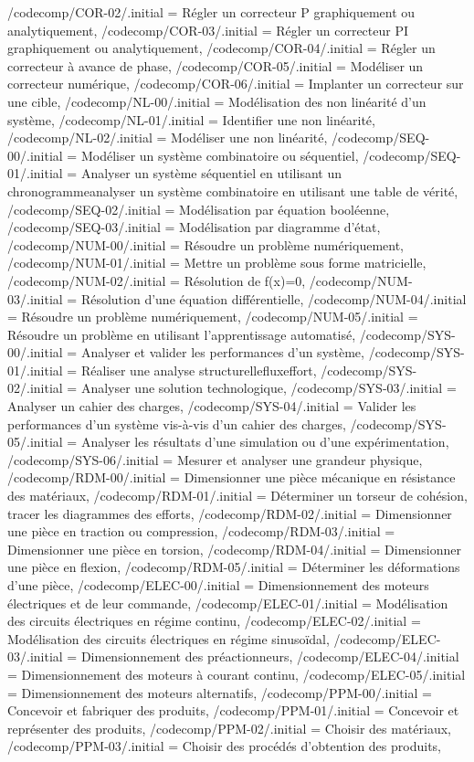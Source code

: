 {    /codecomp/COR-02/.initial = Régler un correcteur P graphiquement ou analytiquement,
    /codecomp/COR-03/.initial = Régler un correcteur PI graphiquement ou analytiquement,
    /codecomp/COR-04/.initial = Régler un correcteur à avance de phase,
    /codecomp/COR-05/.initial = Modéliser un correcteur numérique,
    /codecomp/COR-06/.initial = Implanter un correcteur sur une cible,
    /codecomp/NL-00/.initial = Modélisation des non linéarité d'un système,
    /codecomp/NL-01/.initial = Identifier une non linéarité,
    /codecomp/NL-02/.initial = Modéliser une non linéarité,
    /codecomp/SEQ-00/.initial = Modéliser un système combinatoire ou séquentiel,
    /codecomp/SEQ-01/.initial = Analyser un système séquentiel en utilisant un chronogramme\CommaXp analyser un système combinatoire en utilisant une table de vérité,
    /codecomp/SEQ-02/.initial = Modélisation par équation booléenne,
    /codecomp/SEQ-03/.initial = Modélisation par diagramme d'état,
    /codecomp/NUM-00/.initial = Résoudre un problème numériquement,
    /codecomp/NUM-01/.initial = Mettre un problème sous forme matricielle,
    /codecomp/NUM-02/.initial = Résolution de f(x)=0,
    /codecomp/NUM-03/.initial = Résolution d'une équation différentielle,
    /codecomp/NUM-04/.initial = Résoudre un problème numériquement,
    /codecomp/NUM-05/.initial = Résoudre un problème en utilisant l'apprentissage automatisé,
    /codecomp/SYS-00/.initial = Analyser et valider les performances d'un système,
    /codecomp/SYS-01/.initial = Réaliser une analyse structurelle\CommaXp flux\CommaXp effort,
    /codecomp/SYS-02/.initial = Analyser une solution technologique,
    /codecomp/SYS-03/.initial = Analyser un cahier des charges,
    /codecomp/SYS-04/.initial = Valider les performances d'un système vis-à-vis d'un cahier des charges,
    /codecomp/SYS-05/.initial = Analyser les résultats d'une simulation ou d'une expérimentation,
    /codecomp/SYS-06/.initial = Mesurer et analyser une grandeur physique,
	/codecomp/RDM-00/.initial = Dimensionner une pièce mécanique en résistance des matériaux,
	/codecomp/RDM-01/.initial = Déterminer un torseur de cohésion, tracer les diagrammes des efforts,
	/codecomp/RDM-02/.initial = Dimensionner une pièce en traction ou compression,
	/codecomp/RDM-03/.initial = Dimensionner une pièce en torsion,
	/codecomp/RDM-04/.initial = Dimensionner une pièce en flexion,
	/codecomp/RDM-05/.initial = Déterminer les déformations d'une pièce,
	/codecomp/ELEC-00/.initial = Dimensionnement des moteurs électriques et de leur commande,
	/codecomp/ELEC-01/.initial = Modélisation des circuits électriques en régime continu,
	/codecomp/ELEC-02/.initial = Modélisation des circuits électriques en régime sinusoïdal,
	/codecomp/ELEC-03/.initial = Dimensionnement des préactionneurs,
	/codecomp/ELEC-04/.initial = Dimensionnement des moteurs à courant continu,
	/codecomp/ELEC-05/.initial = Dimensionnement des moteurs alternatifs,
	/codecomp/PPM-00/.initial = Concevoir et fabriquer des produits,
	/codecomp/PPM-01/.initial = Concevoir et représenter des produits,
	/codecomp/PPM-02/.initial = Choisir des matériaux,
	/codecomp/PPM-03/.initial = Choisir des procédés d'obtention des produits,
}

